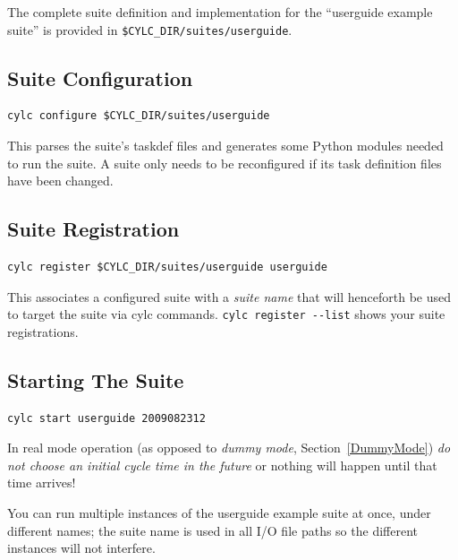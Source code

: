 \documentclass[11pt,a4paper]{article}
\begin{document}
The complete suite definition and implementation for the ``userguide
example suite'' is provided in \lstinline=$CYLC_DIR/suites/userguide=. 


   
\subsection{Suite Configuration}
\label{QuickSuiteConfiguration}

\begin{lstlisting}
cylc configure $CYLC_DIR/suites/userguide
\end{lstlisting}

This parses the suite's taskdef files and generates some Python modules
needed to run the suite. A suite only needs to be reconfigured if its
task definition files have been changed.

\subsection{Suite Registration}
\label{QuickSuiteRegistration}

\begin{lstlisting}
cylc register $CYLC_DIR/suites/userguide userguide 
\end{lstlisting}

This associates a configured suite with a {\em suite name} that will
henceforth be used to target the suite via cylc commands. 
\lstinline=cylc register --list= shows your suite registrations.

\subsection{Starting The Suite}
\label{QuickStartingTheSuite}

\begin{lstlisting}
cylc start userguide 2009082312
\end{lstlisting}


In real mode operation (as opposed to {\em dummy mode},
Section~\ref{DummyMode}) {\em do not choose an initial cycle time in the
future} or nothing will happen until that time arrives!

You can run multiple instances of the userguide example suite at once,
under different names; the suite name is used in all I/O file paths so
the different instances will not interfere. 
\end{document}
